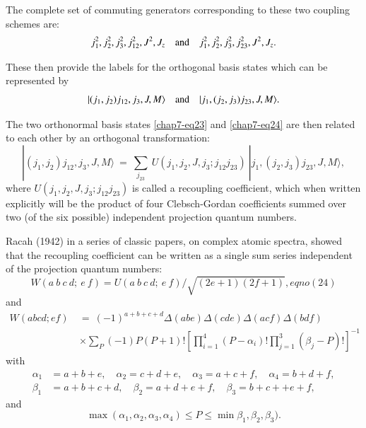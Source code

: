 The complete set of commuting generators corresponding to these two coupling schemes are:
\begin{equation}
j_1^2, j_2^2,j_3^2,j_{12}^2,J^2,J_z\quad {\rm and}\quad j_1^2, j_2^2,j_3^2,j_{23}^2,J^2,J_z. \label{chap7-eq23}
\end{equation}

These then provide the labels for the orthogonal basis states which can be represented by 
\begin{equation}
|(j_1,j_2)j_{12}, j_3, J, M\rangle  \quad {\rm and} \quad |j_1,(j_2,j_3)j_{23}, J, M\rangle. \label{chap7-eq24}
\end{equation}

The two orthonormal basis states \eqref{chap7-eq23} and \eqref{chap7-eq24} are then related to each other by an orthogonal transformation:
\begin{equation}
|(j_1,j_2)j_{12}, j_3, J, M\rangle \ =\ \sum_{j_{23}} \ U(j_1,j_2,J,j_3; j_{12}j_{23})\ |j_1,(j_2,j_3)j_{23}, J, M\rangle, \label{chap7-eq25}
\end{equation}
where $U(j_1,j_2,J,j_3; j_{12}j_{23})$ is called a recoupling coefficient, which when written explicitly will be the product of four Clebsch-Gordan coefficients summed over two (of the six possible) independent projection quantum numbers.

Racah (1942) in a series of classic papers, on complex atomic spectra, showed that the recoupling coefficient can be written as a single sum series independent of the projection quantum numbers:
\begin{equation*}
W(a\ b\ c\ d;\ e\ f) =  U(a\ b\ c\ d;\ e\ f) / \sqrt{(2e+1)(2f+1)}, eqno(24)
\end{equation*}
and
\begin{equation*}
\begin{split}
W(abcd;ef)\ & =\ (-1)^{a+b+c+d} \Delta(abe)\Delta(cde)\Delta(acf)\Delta(bdf) \\
 & \times\sum_P(-1)P (P+1)!\left[ \prod_{i=1}^4 (P-\alpha_i)! \prod_{j=1}^3 (\beta_j-P)! \right]^{-1} \label{chap7-eq25a}
\end{split}
\end{equation*}
with
\begin{equation}
\begin{split}
\alpha_1 & = a+b+e,\quad \alpha_2 = c+d+e, \quad \alpha_3 = a+c+f,\quad \alpha_4 = b+d+f,\\
\beta_1 & = a+b+c+d,\quad \beta_2 = a+d+e+f, \quad \beta_3 = b+c++e+f, \label{chap7-eq26}
\end{split}
\end{equation}
and 
\begin{equation}
\max(\alpha_1,\alpha_2,\alpha_3,\alpha_4)\leq P\leq \min\beta_1,\beta_2,\beta_3). \label{chap7-eq27}
\end{equation}

